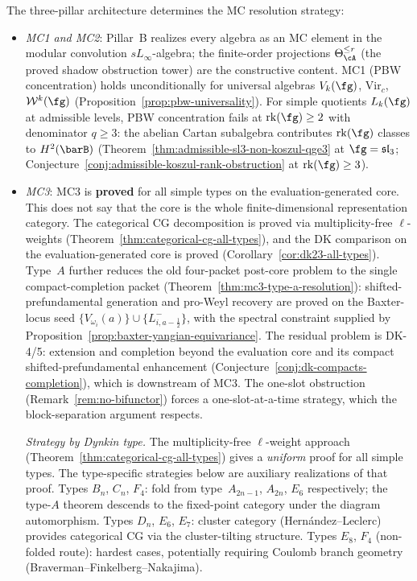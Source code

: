\begin{remark}
\label{rem:three-pillar-mc-unification}
The three-pillar architecture determines the MC resolution strategy:
\begin{itemize}
\item \emph{MC1 and MC2}: Pillar~B realizes every algebra as an MC
 element in the modular convolution $sL_\infty$-algebra; the
 finite-order projections $\Theta_\cA^{\leq r}$ (the proved shadow
 obstruction tower) are the constructive content.
 MC1 (PBW concentration) holds unconditionally for universal
 algebras $V_k(\fg)$, $\mathrm{Vir}_c$, $\mathcal{W}^k(\fg)$
 (Proposition~\ref{prop:pbw-universality}). For simple quotients
 $L_k(\fg)$ at admissible levels, PBW concentration fails at
 $\mathrm{rk}(\fg) \geq 2$ with denominator $q \geq 3$: the
 abelian Cartan subalgebra contributes $\mathrm{rk}(\fg)$ classes
 to $H^2(\barB)$
 (Theorem~\ref{thm:admissible-sl3-non-koszul-qge3} at
 $\fg = \mathfrak{sl}_3$;
 Conjecture~\ref{conj:admissible-koszul-rank-obstruction} at
 $\mathrm{rk}(\fg) \geq 3$).
\item \emph{MC3}: MC3 is \textbf{proved} for all simple types on the
evaluation-generated core. This does not say that the core is the
whole finite-dimensional representation category. The categorical CG decomposition is proved via
multiplicity-free $\ell$-weights
\textup{(}Theorem~\ref{thm:categorical-cg-all-types}\textup{)}, and
the DK comparison on the
evaluation-generated core is proved
\textup{(}Corollary~\ref{cor:dk23-all-types}\textup{)}. Type~$A$
further reduces the old four-packet post-core problem to the single
compact-completion packet
\textup{(}Theorem~\ref{thm:mc3-type-a-resolution}\textup{)}:
shifted-prefundamental generation and pro-Weyl recovery are proved on
the Baxter-locus seed
$\{V_{\omega_i}(a)\}\cup\{L^-_{i,a-\frac{1}{2}}\}$, with the spectral
constraint supplied by
Proposition~\ref{prop:baxter-yangian-equivariance}. The residual
problem is DK-4/5:
extension and completion beyond the evaluation core and its compact
shifted-prefundamental enhancement
\textup{(}Conjecture~\ref{conj:dk-compacts-completion}\textup{)},
which is downstream of MC3. The
one-slot obstruction (Remark~\ref{rem:no-bifunctor}) forces a
one-slot-at-a-time strategy, which the block-separation argument
respects.

 \emph{Strategy by Dynkin type.}
 The multiplicity-free $\ell$-weight approach
 (Theorem~\ref{thm:categorical-cg-all-types}) gives a
 \emph{uniform} proof for all simple types. The type-specific
 strategies below are auxiliary realizations of that proof.
 Types $B_n$, $C_n$, $F_4$: fold from type~$A_{2n-1}$,
 $A_{2n}$, $E_6$ respectively; the type-$A$ theorem descends
 to the fixed-point category under the diagram automorphism.
 Types $D_n$, $E_6$, $E_7$: cluster category
 (Hern\'andez--Leclerc) provides categorical CG via the
 cluster-tilting structure.
 Types $E_8$, $F_4$ (non-folded route): hardest cases,
 potentially requiring Coulomb branch geometry
 (Braverman--Finkelberg--Nakajima).


\end{itemize}
\end{remark}
